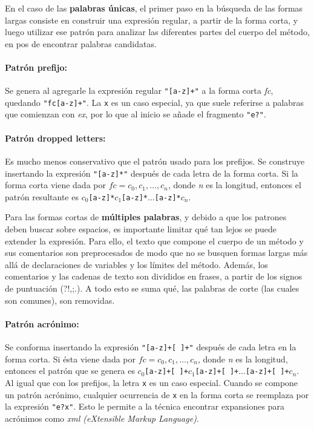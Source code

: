 {En el caso de las \textbf{palabras únicas}, el primer paso en la búsqueda de las formas largas consiste en construir una expresión regular, a partir de la forma corta, y luego utilizar ese patrón para analizar las diferentes partes del cuerpo del método, en pos de encontrar palabras candidatas.

\paragraph{Patrón prefijo:}
Se genera al agregarle la expresión regular \verb;"[a-z]+"; a la forma corta \textit{fc}, quedando \verb;"fc[a-z]+";.
La \verb;x; es un caso especial, ya que suele referirse a palabras que comienzan con \textit{ex}, por lo que al inicio se añade el fragmento \verb;"e?";.

\paragraph{Patrón dropped letters:}
Es mucho menos conservativo que el patrón usado para los prefijos.
Se construye insertando la expresión \verb;"[a-z]*"; después de cada letra de la forma corta.
Si la forma corta viene dada por $fc = c_0, c_1,\dots, c_n$, donde \textit{n} es la longitud, entonces el patrón resultante es $c_0$\verb;[a-z]*;$c_1$\verb;[a-z]*;$\dots$\verb;[a-z]*;$c_n$.

Para las formas cortas de \textbf{múltiples palabras}, y debido a que los patrones deben buscar sobre espacios, es importante limitar qué tan lejos se puede extender la expresión.
Para ello, el texto que compone el cuerpo de un método y sus comentarios son preprocesados de modo que no se busquen formas largas más allá de declaraciones de variables y los límites del método.
Además, los comentarios y las cadenas de texto son divididos en frases, a partir de los signos de puntuación (?!,;.).
A todo esto se suma qué, las palabras de corte (las cuales son comunes), son removidas.

\paragraph{Patrón acrónimo:}
Se conforma insertando la expresión \verb;"[a-z]+[ ]+"; después de cada letra en la forma corta.
Si ésta viene dada por $fc = c_0, c_1,\dots, c_n$, donde \textit{n} es la longitud, entonces el patrón que se genera es $c_0$\verb;[a-z]+[ ]+;$c_1$\verb;[a-z]+[ ]+;$\dots$\verb;[a-z]+[ ]+;$c_n$.
Al igual que con los prefijos, la letra \verb;x; es un caso especial.
Cuando se compone un patrón acrónimo, cualquier ocurrencia de \verb;x; en la forma corta se reemplaza por la expresión \verb;"e?x";.
Esto le permite a la técnica encontrar expansiones para acrónimos como \textit{xml (eXtensible Markup Language)}.

}
